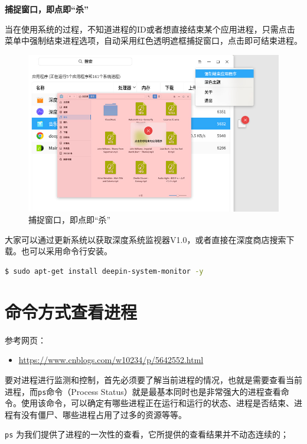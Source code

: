 \documentclass[doctor,openright,twoside]{sjtuthesis}
\providecommand{\tightlist}{%
    \setlength{\itemsep}{0pt}\setlength{\parskip}{0pt}}
\newcommand{\passthrough}[1]{#1}
\theoremstyle{plain}
\theoremstyle{definition}
\theoremstyle{remark}
\theoremstyle{ocrenumbox}
\theoremstyle{plain}
\begin{document}
\textbf{捕捉窗口，即点即``杀''}

当在使用系统的过程，不知道进程的ID或者想直接结束某个应用进程，只需点击菜单中强制结束进程选项，自动采用红色透明遮框捕捉窗口，点击即可结束进程。

\begin{figure}
\centering
\includegraphics{images/deepin-system-monitor-5.jpg}
\caption{捕捉窗口，即点即``杀''}
\end{figure}

大家可以通过更新系统以获取深度系统监视器V1.0，或者直接在深度商店搜索下载。也可以采用命令行安装。

\begin{lstlisting}[language=bash]
$ sudo apt-get install deepin-system-monitor -y
\end{lstlisting}

\hypertarget{section-95}{%
\section{命令方式查看进程}\label{section-95}}

参考网页：

\begin{itemize}
\tightlist
\item
  \url{https://www.cnblogs.com/w10234/p/5642552.html}
\end{itemize}

要对进程进行监测和控制，首先必须要了解当前进程的情况，也就是需要查看当前进程，而\passthrough{\lstinline!ps!}命令（Process Status）就是最基本同时也是非常强大的进程查看命令。使用该命令，可以确定有哪些进程正在运行和运行的状态、进程是否结束、进程有没有僵尸、哪些进程占用了过多的资源等等。

\passthrough{\lstinline!ps!} 为我们提供了进程的一次性的查看，它所提供的查看结果并不动态连续的；
\end{document}
